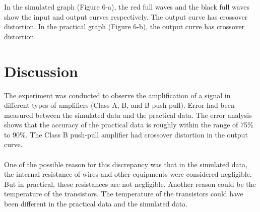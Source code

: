 \documentclass[12pt]{article}
\begin{document}
In the simulated graph (Figure 6-a), the red full waves and the black full waves show the input and output curves respectively. The output curve has crossover distortion. In the practical graph (Figure 6-b), the output curve has crossover distortion.

\section{Discussion}
The experiment was conducted to observe the amplification of a signal in different types of amplifiers (Class A, B, and B push pull). Error had been measured between the simulated data and the practical data. The error analysis shows that the accuracy of the practical data is roughly within the range of 75\% to 90\%. The Class B push-pull amplifier had crossover distortion in the output curve. \\~\\

One of the possible reason for this discrepancy was that in the simulated data, the internal resistance of wires and other equipments were considered negligible. But in practical, these resistances are not negligible. Another reason could be the temperature of the transistors. The temperature of the transistors could have been different in the practical data and the simulated data.
\end{document}
